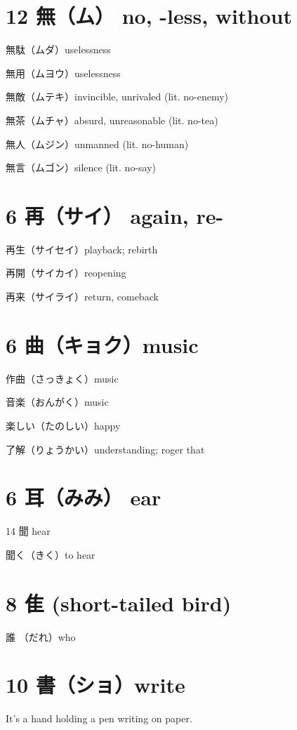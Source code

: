 \section{12 無（ム） no, -less, without}

無駄（ムダ）uselessness

無用（ムヨウ）uselessness

無敵（ムテキ）invincible, unrivaled (lit. no-enemy)

無茶（ムチャ）absurd, unreasonable (lit. no-tea)

無人（ムジン）unmanned (lit. no-human)

無言（ムゴン）silence (lit. no-say)

\section{6 再（サイ） again, re-}

再生（サイセイ）playback; rebirth

再開（サイカイ）reopening

再来（サイライ）return, comeback

\section{6 曲（キョク）music}

作曲（さっきょく）music

音楽（おんがく）music

楽しい（たのしい）happy

了解（りょうかい）understanding; roger that

\section{6 耳（みみ） ear}

14 聞 hear

聞く（きく）to hear

\section{8 隹 (short-tailed bird)}

誰 （だれ）who

\section{10 書（ショ）write}

It's a hand holding a pen writing on paper.

